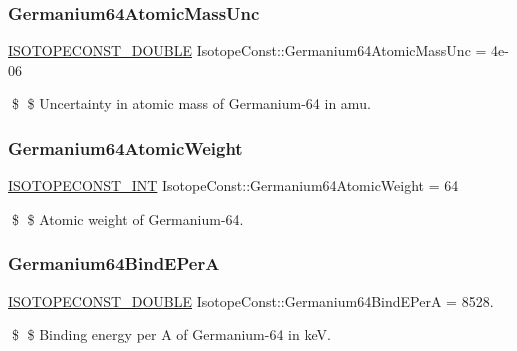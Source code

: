 \subsubsection{\texorpdfstring{Germanium64\+Atomic\+Mass\+Unc}{Germanium64AtomicMassUnc}}
{\footnotesize\ttfamily \mbox{\hyperlink{group___isotope_const-_macros_ga8f45a7272ce02c0b4c65c44636ed719a}{I\+S\+O\+T\+O\+P\+E\+C\+O\+N\+S\+T\+\_\+\+D\+O\+U\+B\+LE}} Isotope\+Const\+::\+Germanium64\+Atomic\+Mass\+Unc = 4e-\/06}

\$ \$ Uncertainty in atomic mass of Germanium-\/64 in amu. \mbox{\label{group___isotope_const-_germanium-_ge64_ga708cb7b72d1d5d39651cf4b54ffb9766}} 
\subsubsection{\texorpdfstring{Germanium64\+Atomic\+Weight}{Germanium64AtomicWeight}}
{\footnotesize\ttfamily \mbox{\hyperlink{group___isotope_const-_macros_ga5f18360b3e99483a35c32d789e62621c}{I\+S\+O\+T\+O\+P\+E\+C\+O\+N\+S\+T\+\_\+\+I\+NT}} Isotope\+Const\+::\+Germanium64\+Atomic\+Weight = 64}

\$ \$ Atomic weight of Germanium-\/64. \mbox{\label{group___isotope_const-_germanium-_ge64_ga07a87ebdb8c831f5ab5e424030705841}} 
\subsubsection{\texorpdfstring{Germanium64\+Bind\+E\+PerA}{Germanium64BindEPerA}}
{\footnotesize\ttfamily \mbox{\hyperlink{group___isotope_const-_macros_ga8f45a7272ce02c0b4c65c44636ed719a}{I\+S\+O\+T\+O\+P\+E\+C\+O\+N\+S\+T\+\_\+\+D\+O\+U\+B\+LE}} Isotope\+Const\+::\+Germanium64\+Bind\+E\+PerA = 8528.}

\$ \$ Binding energy per A of Germanium-\/64 in keV. \mbox{\label{group___isotope_const-_germanium-_ge64_gaa5d69cc47a7d52dfc39baa704f521a2f}} 
